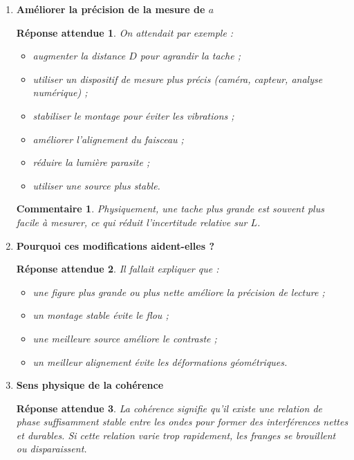 \documentclass[11pt,a4paper]{article}
\newtheorem*{reponseattendue}{Réponse attendue}
\newtheorem*{commentaire}{Commentaire}
\begin{document}
\begin{enumerate}[label=\textbf{1.\arabic*}, resume, leftmargin=1.6em]

\item \textbf{Améliorer la précision de la mesure de \(a\)}

\begin{reponseattendue}
On attendait par exemple :
\begin{itemize}
    \item augmenter la distance \(D\) pour agrandir la tache ;
    \item utiliser un dispositif de mesure plus précis (caméra, capteur, analyse numérique) ;
    \item stabiliser le montage pour éviter les vibrations ;
    \item améliorer l’alignement du faisceau ;
    \item réduire la lumière parasite ;
    \item utiliser une source plus stable.
\end{itemize}
\end{reponseattendue}

\begin{commentaire}
Physiquement, une tache plus grande est souvent plus facile à mesurer, ce qui réduit l’incertitude relative sur \(L\).
\end{commentaire}

\item \textbf{Pourquoi ces modifications aident-elles ?}

\begin{reponseattendue}
Il fallait expliquer que :
\begin{itemize}
    \item une figure plus grande ou plus nette améliore la précision de lecture ;
    \item un montage stable évite le flou ;
    \item une meilleure source améliore le contraste ;
    \item un meilleur alignement évite les déformations géométriques.
\end{itemize}
\end{reponseattendue}

\item \textbf{Sens physique de la cohérence}

\begin{reponseattendue}
La cohérence signifie qu’il existe une relation de phase suffisamment stable entre les ondes pour former des interférences nettes et durables.  
Si cette relation varie trop rapidement, les franges se brouillent ou disparaissent.
\end{reponseattendue}


\end{enumerate}
\end{document}
